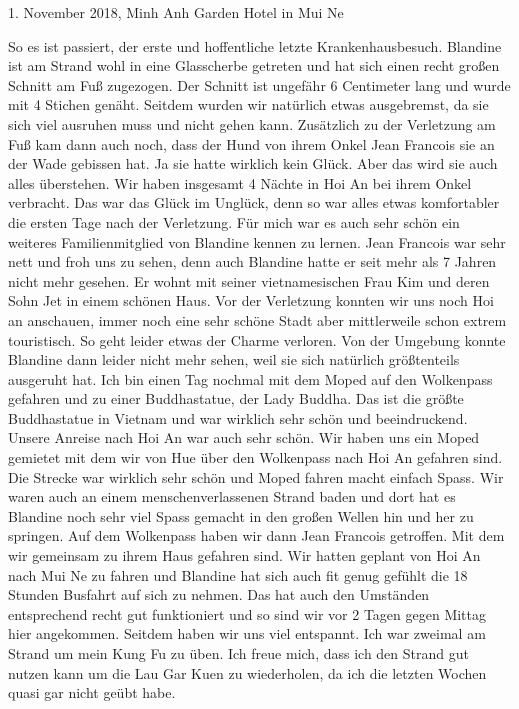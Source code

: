 \documentclass[11pt]{book}
\begin{document}
1. November 2018, Minh Anh Garden Hotel in Mui Ne

So es ist passiert, der erste und hoffentliche letzte Krankenhausbesuch. Blandine ist am Strand wohl in eine Glasscherbe
getreten und hat sich einen recht großen Schnitt am Fuß zugezogen. Der Schnitt ist ungefähr 6 Centimeter lang und 
wurde mit 4 Stichen genäht. Seitdem wurden wir natürlich etwas ausgebremst, da sie sich viel ausruhen muss und nicht
gehen kann. Zusätzlich zu der Verletzung am Fuß kam dann auch noch, dass der Hund von ihrem Onkel Jean Francois sie 
an der Wade gebissen hat. Ja sie hatte wirklich kein Glück. Aber das wird sie auch alles überstehen. Wir haben 
insgesamt 4 Nächte in Hoi An bei ihrem Onkel verbracht. Das war das Glück im Unglück, denn so war alles etwas 
komfortabler die ersten Tage nach der Verletzung. Für mich war es auch sehr schön ein weiteres Familienmitglied von 
Blandine kennen zu lernen. Jean Francois war sehr nett und froh uns zu sehen, denn auch Blandine hatte er seit mehr 
als 7 Jahren nicht mehr gesehen. Er wohnt mit seiner vietnamesischen Frau Kim und deren Sohn Jet in einem schönen 
Haus. Vor der Verletzung konnten wir uns noch Hoi an anschauen, immer noch eine sehr schöne Stadt aber mittlerweile 
schon extrem touristisch. So geht leider etwas der Charme verloren. Von der Umgebung konnte Blandine dann leider 
nicht mehr sehen, weil sie sich natürlich größtenteils ausgeruht hat. Ich bin einen Tag nochmal mit dem Moped 
auf den Wolkenpass gefahren und zu einer Buddhastatue, der Lady Buddha. Das ist die größte Buddhastatue in Vietnam 
und war wirklich sehr schön und beeindruckend. 
Unsere Anreise nach Hoi An war auch sehr schön. Wir haben uns ein Moped gemietet mit dem wir von Hue über den Wolkenpass 
nach Hoi An gefahren sind. Die Strecke war wirklich sehr schön und Moped fahren macht einfach Spass. Wir waren auch 
an einem menschenverlassenen Strand baden und dort hat es Blandine noch sehr viel Spass gemacht in den großen 
Wellen hin und her zu springen. Auf dem Wolkenpass haben wir dann Jean Francois getroffen. Mit dem wir gemeinsam 
zu ihrem Haus gefahren sind.
Wir hatten geplant von Hoi An nach Mui Ne zu fahren und Blandine hat sich auch fit genug gefühlt die 18 Stunden 
Busfahrt auf sich zu nehmen. Das hat auch den Umständen entsprechend recht gut funktioniert und so sind wir vor 
2 Tagen gegen Mittag hier angekommen. Seitdem haben wir uns viel entspannt. Ich war zweimal am Strand um mein Kung 
Fu zu üben. Ich freue mich, dass ich den Strand gut nutzen kann um die Lau Gar Kuen zu wiederholen, da ich die 
letzten Wochen quasi gar nicht geübt habe. 
\end{document}
